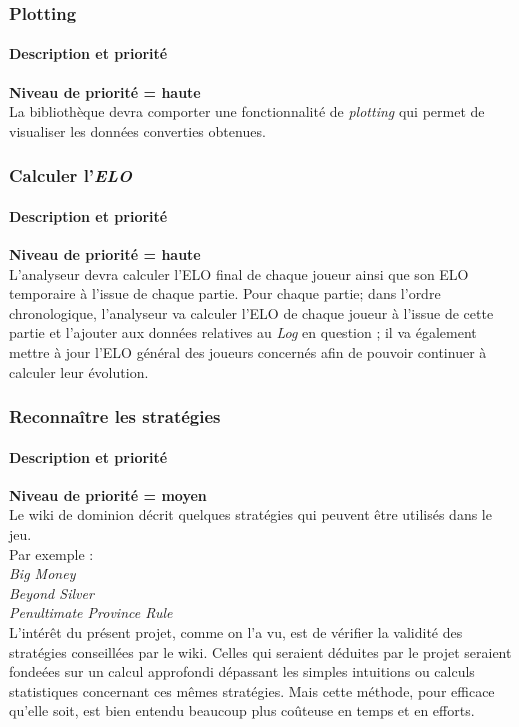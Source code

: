 \subsubsection{Plotting}
\paragraph*{Description et priorité}
\textbf{Niveau de priorité = haute}\\

La bibliothèque devra comporter une fonctionnalité de \textit{plotting} qui permet de visualiser  les données converties obtenues.
\subsubsection{Calculer l'\textit{\textbf{ELO}}}
\paragraph*{Description et priorité}
\textbf{Niveau de priorité = haute}\\

L'analyseur devra calculer l'ELO final de chaque joueur ainsi que son ELO temporaire à l'issue de chaque partie.\newline
Pour chaque partie; dans l'ordre chronologique, l'analyseur va calculer l'ELO de chaque joueur à l'issue de cette partie et l'ajouter aux données relatives au \textit{Log} en question ; il va également mettre à jour l'ELO général des joueurs concernés afin de pouvoir continuer à calculer leur évolution.

\subsubsection{Reconnaître les stratégies}
\paragraph*{Description et priorité}
\textbf{Niveau de priorité = moyen}\\

Le wiki de dominion décrit quelques stratégies qui peuvent être utilisés dans le jeu.\\Par exemple :\\
\textit{Big Money}\\
\textit{Beyond Silver}\\
\textit{Penultimate Province Rule}\\
L'intérêt du présent projet, comme on l'a vu, est de vérifier la validité des stratégies conseillées par le wiki. Celles qui seraient déduites par le projet seraient fondeées sur un calcul approfondi dépassant les simples intuitions ou calculs statistiques concernant ces mêmes stratégies. Mais cette méthode, pour efficace qu'elle soit, est bien entendu beaucoup plus coûteuse en temps et en efforts.
\\

